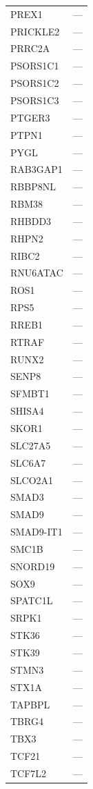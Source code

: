\begin{longtable}{ll}
  PREX1 & --- \\
  PRICKLE2 & --- \\
  PRRC2A & --- \\
  PSORS1C1 & --- \\
  PSORS1C2 & --- \\
  PSORS1C3 & --- \\
  PTGER3 & --- \\
  PTPN1 & --- \\
  PYGL & --- \\
  RAB3GAP1 & --- \\
  RBBP8NL & --- \\
  RBM38 & --- \\
  RHBDD3 & --- \\
  RHPN2 & --- \\
  RIBC2 & --- \\
  RNU6ATAC & --- \\
  ROS1 & --- \\
  RPS5 & --- \\
  RREB1 & --- \\
  RTRAF & --- \\
  RUNX2 & --- \\
  SENP8 & --- \\
  SFMBT1 & --- \\
  SHISA4 & --- \\
  SKOR1 & --- \\
  SLC27A5 & --- \\
  SLC6A7 & --- \\
  SLCO2A1 & --- \\
  SMAD3 & --- \\
  SMAD9 & --- \\
  SMAD9-IT1 & --- \\
  SMC1B & --- \\
  SNORD19 & --- \\
  SOX9 & --- \\
  SPATC1L & --- \\
  SRPK1 & --- \\
  STK36 & --- \\
  STK39 & --- \\
  STMN3 & --- \\
  STX1A & --- \\
  TAPBPL & --- \\
  TBRG4 & --- \\
  TBX3 & --- \\
  TCF21 & --- \\
  TCF7L2 & --- \\

\end{longtable}
